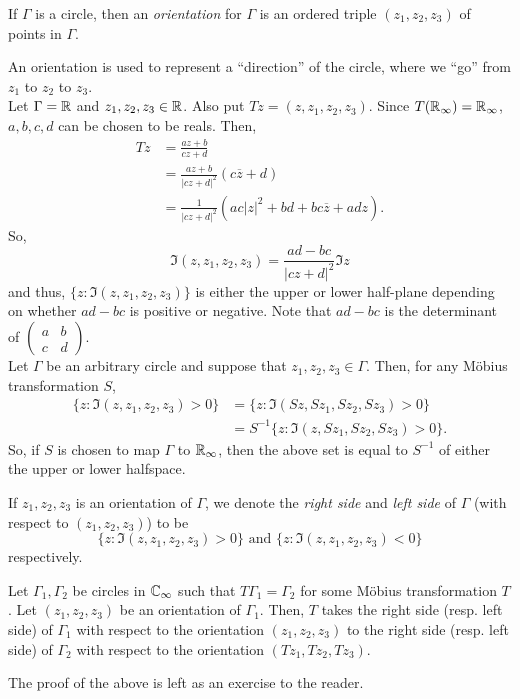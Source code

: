 	\begin{fdef}
		If $\Gamma$ is a circle, then an \emph{orientation} for $\Gamma$ is an ordered triple $(z_1,z_2,z_3)$ of points in $\Gamma$.
	\end{fdef}
	An orientation is used to represent a ``direction'' of the circle, where we ``go'' from $z_1$ to $z_2$ to $z_3$.\\

	Let $\Gamma = \mathbb{R}$ and $z_1,z_2,z_3 \in \mathbb{R}$. Also put $Tz = (z,z_1,z_2,z_3)$. Since $T(\mathbb{R}_\infty) = \mathbb{R}_\infty$, $a,b,c,d$ can be chosen to be reals. Then,
	\begin{align*}
		Tz &= \frac{az+b}{cz+d} \\
			&= \frac{az+b}{|cz+d|^2} (c\overline{z}+d) \\
			&= \frac{1}{|cz+d|^2} \left( ac |z|^2 + bd + bc\overline{z} + adz \right).
	\end{align*}
	So,
	\[ \Im(z,z_1,z_2,z_3) = \frac{ad-bc}{|cz+d|^2} \Im z \]
	and thus, $\{ z : \Im (z,z_1,z_2,z_3) \}$ is either the upper or lower half-plane depending on whether $ad-bc$ is positive or negative. Note that $ad-bc$ is the determinant of $\begin{pmatrix}a & b \\ c & d\end{pmatrix}$.\\

	Let $\Gamma$ be an arbitrary circle and suppose that $z_1,z_2,z_3 \in \Gamma$. Then, for any M\"{o}bius transformation $S$,
	\begin{align*}
		\{ z : \Im(z,z_1,z_2,z_3) > 0 \} &= \{ z : \Im(Sz,Sz_1,Sz_2,Sz_3) > 0 \} \\
			&= S^{-1} \{ z : \Im(z,Sz_1,Sz_2,Sz_3) > 0 \}.
	\end{align*}
	So, if $S$ is chosen to map $\Gamma$ to $\mathbb{R}_\infty$, then the above set is equal to $S^{-1}$ of either the upper or lower halfspace.\\

	\begin{definition}
		If $z_1,z_2,z_3$ is an orientation of $\Gamma$, we denote the \emph{right side} and \emph{left side} of $\Gamma$ (with respect to $(z_1,z_2,z_3)$) to be
		\[ \{ z : \Im(z,z_1,z_2,z_3) > 0 \} \text{ and } \{z : \Im(z,z_1,z_2,z_3) < 0\} \]
		respectively.
	\end{definition}

	\begin{theorem}
		Let $\Gamma_1,\Gamma_2$ be circles in $\mathbb{C}_\infty$ such that $T\Gamma_1 = \Gamma_2$ for some M\"{o}bius transformation $T$. Let $(z_1,z_2,z_3)$ be an orientation of $\Gamma_1$. Then, $T$ takes the right side (resp. left side) of $\Gamma_1$ with respect to the orientation $(z_1,z_2,z_3)$ to the right side (resp. left side) of $\Gamma_2$ with respect to the orientation $(Tz_1,Tz_2,Tz_3)$.
	\end{theorem}
	The proof of the above is left as an exercise to the reader.\\

